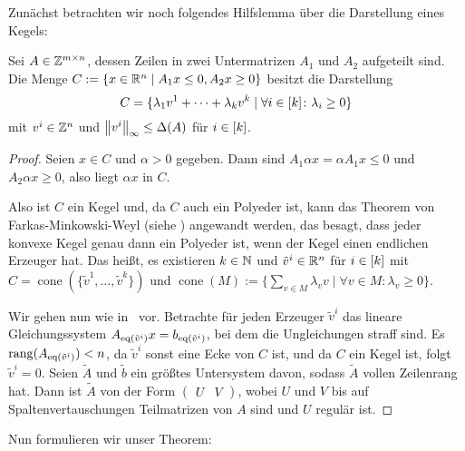 Zunächst betrachten wir noch folgendes Hilfslemma über die Darstellung eines Kegels:
\begin{lemma}\label{lem:cone}
	Sei $A\in\mathbb{Z}^{m\times n}$, dessen Zeilen in zwei Untermatrizen $A_1$ und $A_2$ aufgeteilt sind.
	Die Menge $C:=\{ x\in\mathbb{R}^n \mid A_1x\leq 0, A_2x\geq0 \}$ besitzt die Darstellung \[ C=\{\lambda_1 v^1+\dots+\lambda_kv^k \mid \forall i\in[k] \colon\lambda_i\geq0 \}\] mit $v^i\in\mathbb{Z}^n$ und $\left\lVert v^i\right\rVert_\infty\leq\Delta(A)$ für $i\in[k]$.
\end{lemma}
\begin{proof}
	\newcommand{\cone}[1]{\operatorname{cone}({#1})}
	Seien $x\in C$ und $\alpha>0$ gegeben.
	Dann sind $A_1 \alpha x=\alpha A_1 x\leq 0$ und $A_2\alpha x\geq0$, also liegt $\alpha x$ in $C$.
	
	Also ist $C$ ein Kegel und, da $C$ auch ein Polyeder ist, kann das Theorem von Farkas-Minkowski-Weyl (siehe \cite[Korollar 7.1a]{Schrijver1986}) angewandt werden, das besagt, dass jeder konvexe Kegel genau dann ein Polyeder ist, wenn der Kegel einen endlichen Erzeuger hat.
	Das heißt, es existieren $k\in\mathbb{N}$ und $\tilde{v}^i\in\mathbb{R}^n$ für $i\in[k]$ mit $C=\cone{\{\tilde{v}^1,\dots,\tilde{v}^k\}}$ und $\cone{M}:=\{\sum_{v\in M}\lambda_v  v \mid \forall v\in M \colon\lambda_v\geq0 \}$.
	
	Wir gehen nun wie in~\cite[Beweis Lemma 10.9]{thomas2008} vor.
	Betrachte für jeden Erzeuger $\tilde{v}^i$ das lineare Gleichungssystem $A_{\operatorname{eq}(\tilde{v}^i)}x=b_{\operatorname{eq}(\tilde{v}^i)}$, bei dem die Ungleichungen straff sind.
	Es $\operatorname{rang}(A_{\operatorname{eq}(\tilde{v}^i)}) < n$, da $\tilde{v}^i$ sonst eine Ecke von $C$ ist, und da $C$ ein Kegel ist, folgt $\tilde{v}^i=0$.
	Seien $\tilde{A}$ und $\tilde{b}$ ein größtes Untersystem davon, sodass $\tilde{A}$ vollen Zeilenrang hat.
	Dann ist $\tilde{A}$ von der Form $\begin{pmatrix}U & V\end{pmatrix}$, wobei $U$ und $V$ bis auf Spaltenvertauschungen Teilmatrizen von $A$ sind und $U$ regulär ist.
	
\end{proof}

Nun formulieren wir unser Theorem:

